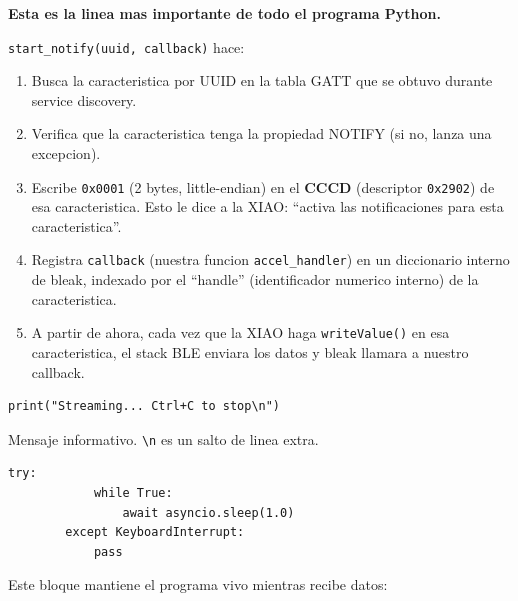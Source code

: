 \documentclass[11pt,a4paper]{article}
\begin{document}
\textbf{Esta es la linea mas importante de todo el programa Python.}

\texttt{start\_notify(uuid, callback)} hace:

\begin{enumerate}
    \item Busca la caracteristica por UUID en la tabla GATT que se
          obtuvo durante service discovery.
    \item Verifica que la caracteristica tenga la propiedad NOTIFY
          (si no, lanza una excepcion).
    \item Escribe \texttt{0x0001} (2 bytes, little-endian) en el
          \textbf{CCCD} (descriptor \texttt{0x2902}) de esa
          caracteristica. Esto le dice a la XIAO: ``activa las
          notificaciones para esta caracteristica''.
    \item Registra \texttt{callback} (nuestra funcion
          \texttt{accel\_handler}) en un diccionario interno de
          bleak, indexado por el ``handle'' (identificador numerico
          interno) de la caracteristica.
    \item A partir de ahora, cada vez que la XIAO haga
          \texttt{writeValue()} en esa caracteristica, el stack BLE
          enviara los datos y bleak llamara a nuestro callback.
\end{enumerate}

\begin{lstlisting}[style=python]
        print("Streaming... Ctrl+C to stop\n")
\end{lstlisting}

Mensaje informativo. \texttt{\textbackslash n} es un salto de linea
extra.

\begin{lstlisting}[style=python]
        try:
            while True:
                await asyncio.sleep(1.0)
        except KeyboardInterrupt:
            pass
\end{lstlisting}

Este bloque mantiene el programa vivo mientras recibe datos:
\end{document}
